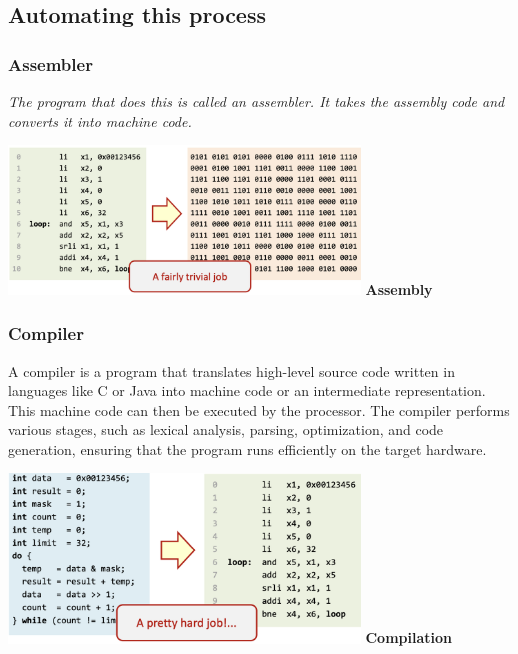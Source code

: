 \subsection{Automating this process}
\subsubsection{Assembler}
\textit{The program that does this is called an assembler. It takes the assembly code and converts it into machine code.} \newline
\begin{center}
    \includegraphics[width=0.7\textwidth]{chapters/chapter1/images/assembler.png}
    \centering
    \textbf{Assembly}
\end{center}
\subsubsection{Compiler}
A compiler is a program that translates high-level source code written in languages like C or Java into machine code or an intermediate representation. This machine code can then be executed by the processor. The compiler performs various stages, such as lexical analysis, parsing, optimization, and code generation, ensuring that the program runs efficiently on the target hardware.
\begin{center}
    \includegraphics[width=0.7\textwidth]{chapters/chapter1/images/compiler.png}
    \centering
    \textbf{Compilation}
\end{center}



